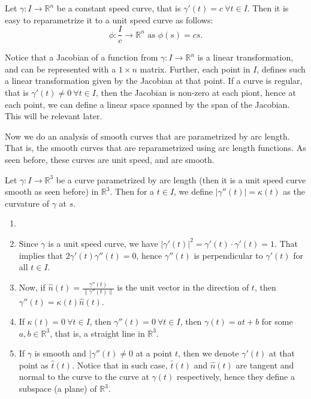 \begin{eg}
    Let $\gamma:I\to\mathbb{R}^{n}$ be a constant speed curve, that is $\gamma'(t)=c~\forall t\in I$. Then it is easy to reparametrize it to a unit speed curve as follows: $$\phi:\frac{I}{c}\to\mathbb{R}^{n}\text{ as }\phi(s)=cs.$$
\end{eg}
\vspace{0.4cm}
\begin{note}
    Notice that a Jacobian of a function from $\gamma:I\to \mathbb{R}^{n}$ is a linear transformation, and can be represented with a $1\times n$ matrix. Further, each point in $I$, defines such a linear transformation given by the Jacobian at that point. If a curve is regular, that is $\gamma'(t)\neq0~\forall t\in I$, then the Jacobian is non-zero at each piont, hence at each point, we can define a linear space spanned by the span of the Jacobian. This will be relevant later.
\end{note}
\vspace{0.4cm}
\begin{motive}
    Now we do an analysis of smooth curves that are parametrized by arc length. That is, the smooth curves that are reparametrized using arc length functions. As seen before, these curves are unit speed, and are smooth.
\end{motive}
\vspace{0.4cm}
\begin{definition}
    Let $\gamma:I\to \mathbb{R}^{3}$ be a curve parametrized by arc length (then it is a unit speed curve smooth as seen before) in $\mathbb{R}^{3}$. Then for a $t\in I$, we define $|\gamma''(t)|=\kappa(t)$ as the curvature of $\gamma$ at $s$.
\end{definition}
\vspace{0.4cm}
\begin{property}
    \begin{enumerate}[label=\roman*.]
        \item []
        \item Since $\gamma$ is a unit speed curve, we have $|\gamma'(t)|^{2}=\gamma'(t)\cdot\gamma'(t)=1$. That implies that $2\gamma'(t)\gamma''(t)=0$, hence $\gamma''(t)$ is perpendicular to $\gamma'(t)$ for all $t\in I$. 
        \item Now, if $\hat{n}(t)=\frac{\gamma''(t)}{\|\gamma''(t)\|}$ is the unit vector in the direction of $t$, then $\gamma''(t)=\kappa(t)\hat{n}(t)$.
        \item If $\kappa(t)=0~\forall t\in I$, then $\gamma''(t)=0~\forall t\in I$, then $\gamma(t)=at+b$ for some $a,b\in \mathbb{R}^{3}$, that is, a straight line in $\mathbb{R}^{3}$.
        \item If $\gamma$ is smooth and $|\gamma''(t)\neq 0$ at a point $t$, then we denote $\gamma'(t)$ at that point as $\hat{t}(t)$. Notice that in such case, $\hat{t}(t)$ and $\hat{n}(t)$ are tangent and normal to the curve to the curve at $\gamma(t)$ respectively, hence they define a subspace (a plane) of $\mathbb{R}^{3}$.
    \end{enumerate}
\end{property}
